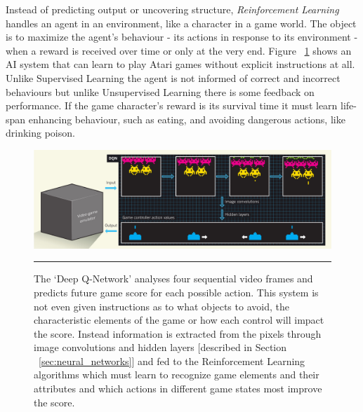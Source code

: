 Instead of predicting output or uncovering structure, \textit{Reinforcement Learning} handles an agent in an environment, like a character in a game world.
The object is to maximize the agent's behaviour - its actions in response to its environment - when a reward is received over time or only at the very end.
Figure ~\ref{fig:Reinforcement _Learning_2} shows an AI system that can learn to play Atari games without explicit instructions at all.
Unlike Supervised Learning the agent is not informed of correct and incorrect behaviours but unlike Unsupervised Learning there is some feedback on performance.
If the game character's reward is its survival time it must learn life-span enhancing behaviour, such as eating, and avoiding dangerous actions, like drinking poison.
\citep{barber2012bayesian}

\begin{figure}[htbp]
	\centering
		\includegraphics[width = 1.0\textwidth]{./Figures/Reinforcement_Learning_Learning_to_see_and_act.jpg}
		\rule{35em}{0.5pt}
	\caption[Reinforcement Learning]{The `Deep Q-Network' analyses four sequential video frames and predicts future game score for each possible action. This system is not even given instructions as to what objects to avoid, the characteristic elements of the game or how each control will impact the score. Instead information is extracted from the pixels through image convolutions and hidden layers [described in Section ~\ref{sec:neural_networks}] and fed to the Reinforcement Learning algorithms which must learn to recognize game elements and their attributes and which actions in different game states most improve the score.}
	\label{fig:Reinforcement _Learning_2}
\end{figure}

